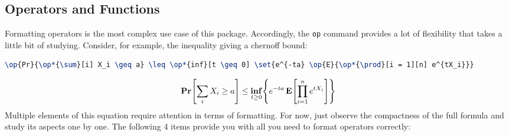 \documentclass[a4paper,10pt]{scrartcl}
\begin{document}
\subsection{Operators and Functions}
Formatting operators is the most complex use case of this package. Accordingly, the \texttt{op} command provides a lot of flexibility that takes a little bit of studying. Consider, for example, the inequality giving a chernoff bound:
\begin{lstlisting}[caption=Chernoff bound, language=TeX]
\op{Pr}{\op*{\sum}[i] X_i \geq a} \leq \op*{inf}[t \geq 0] \set{e^{-ta} \op{E}{\op*{\prod}[i = 1][n] e^{tX_i}}}
\end{lstlisting}
\begin{align} 
  \op{Pr}{\op*{\sum}[i] X_i \geq a} \leq \op*{inf}[t \geq 0] \set{e^{-ta} \op{E}{\op*{\prod}[i = 1][n] e^{tX_i}}}
\end{align}
Multiple elements of this equation require attention in terms of formatting. For now, just observe the compactness of the full formula and study its aspects one by one. The following 4 items provide you with all you need to format operators correctly:
\end{document}
